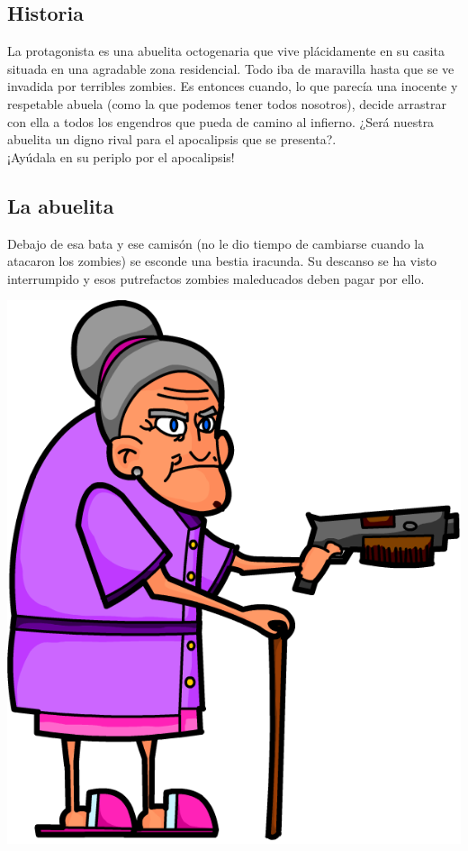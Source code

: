 \subsection{Historia}
La protagonista es una abuelita octogenaria que vive plácidamente en su casita situada en una agradable zona residencial. Todo iba de maravilla hasta que se ve invadida por terribles zombies. Es entonces cuando, lo que parecía una inocente y respetable abuela (como la que podemos tener todos nosotros), decide arrastrar con ella a todos los engendros que pueda de camino al infierno. ¿Será nuestra abuelita un digno rival para el apocalipsis que se presenta?.\\

¡Ayúdala en su periplo por el apocalipsis!

\subsection{La abuelita}
Debajo de esa bata y ese camisón (no le dio tiempo de cambiarse cuando la atacaron los zombies) se esconde una bestia iracunda. Su descanso se ha visto interrumpido y esos putrefactos zombies maleducados deben pagar por ello.

\begin{center}
	\includegraphics[scale=0.2]{granny.png}
\end{center}

